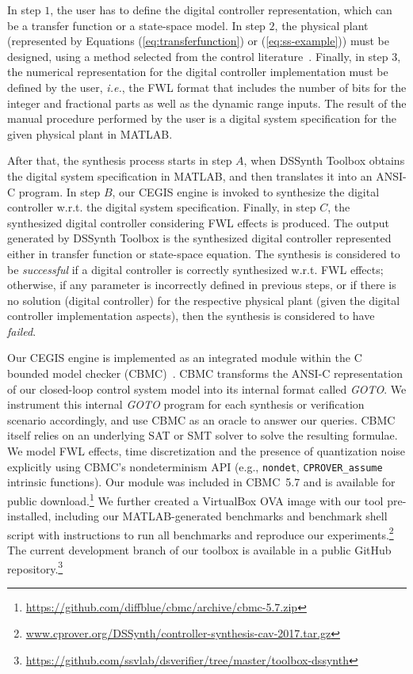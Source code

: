 \documentclass[10pt,conference]{IEEEtran}
\newcommand\tool{{DSSynth Toolbox}\xspace}
\begin{document}
In step $1$, the user has to define the digital controller representation, 
which can be a transfer function or a state-space model. 
In step $2$, the physical plant (represented by Equations (\ref{eq:transferfunction}) 
or (\ref{eq:ss-example})) must be designed, using a method selected 
from the control literature~\cite{astrom1997computer}. Finally, in step $3$, 
the numerical representation for the digital controller implementation must be 
defined by the user, {\it i.e.}, the FWL format that includes the number of bits for the integer 
and fractional parts as well as the dynamic range inputs. The result of the manual 
procedure performed by the user is a digital system specification for the given 
physical plant in MATLAB. 

After that, the synthesis process starts in step $A$, when \tool obtains the digital system 
specification in MATLAB, and then translates it into an ANSI-C program. 
In step $B$, our CEGIS engine is invoked to synthesize the digital controller w.r.t. the digital system
specification. Finally, in step $C$, the synthesized digital controller considering FWL effects is produced. 
The output generated by \tool is the synthesized digital controller represented either in transfer function 
or state-space equation. The synthesis is considered to be \emph{successful} if a digital controller is correctly 
synthesized w.r.t. FWL effects; otherwise, if any parameter is incorrectly defined in previous steps, 
or if there is no solution (digital controller) for the respective physical plant (given the digital controller
 implementation aspects), then the synthesis is considered to have \emph{failed}.

Our CEGIS engine is implemented as an integrated module within the C bounded model checker (CBMC)~\cite{cbmc}.  CBMC
transforms the ANSI-C representation of our closed-loop control system model into its internal format called
\emph{GOTO}.  We instrument this internal \emph{GOTO} program for each synthesis or verification scenario accordingly,
and use CBMC as an oracle to answer our queries.  CBMC itself relies on an underlying SAT or SMT solver to solve the
resulting formulae.  We model FWL effects, time discretization and the presence of quantization noise explicitly using CBMC's  
nondeterminism API (e.g., \texttt{nondet}, \texttt{CPROVER\_assume} intrinsic functions).  Our module was included in CBMC~5.7 and is available for
public download.\footnote{\url{https://github.com/diffblue/cbmc/archive/cbmc-5.7.zip}}  We further created a VirtualBox OVA image
with our tool pre-installed, including our MATLAB-generated benchmarks and benchmark shell script with instructions
to run all benchmarks and reproduce our
experiments.\footnote{\url{www.cprover.org/DSSynth/controller-synthesis-cav-2017.tar.gz}}  The current development branch
of our toolbox is available in a public GitHub
repository.\footnote{\url{https://github.com/ssvlab/dsverifier/tree/master/toolbox-dssynth}}
\end{document}
